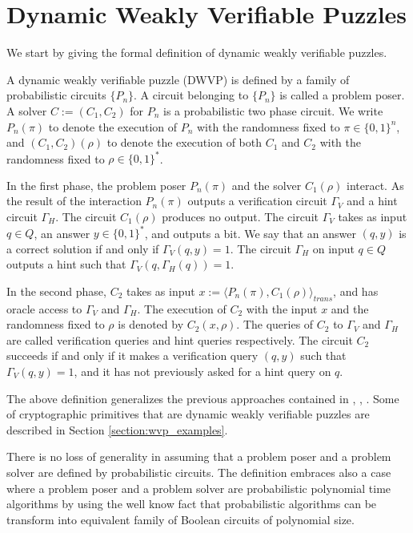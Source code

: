 \documentclass[11pt,a4paper,titlepage]{memoir}
\begin{document}
\section{Dynamic Weakly Verifiable Puzzles}
\label{section:wvp}
We start by giving the formal definition of dynamic weakly verifiable puzzles.
\begin{definition}
  \label{def:dwvp}
  A dynamic weakly verifiable puzzle (DWVP) is defined by a family of probabilistic circuits $\{P_n\}$.
  A circuit belonging to $\{P_n\}$ is called a problem poser.
  A solver $C := (C_1, C_2)$ for $P_n$ is a probabilistic two phase circuit.
  We write $P_n(\pi)$ to denote the execution of $P_n$ with the randomness fixed to $\pi \in \{0,1\}^n$, and $(C_1,C_2)(\rho)$
  to denote the execution of both $C_1$ and $C_2$ with the randomness fixed to $\rho \in \{0,1\}^{*}$.

  In the first phase, the problem poser $P_n(\pi)$ and the solver $C_1(\rho)$ interact.
  As the result of the interaction $P_n(\pi)$ outputs a verification circuit $\Gamma_{V}$ and a hint circuit $\Gamma_{H}$.
  The circuit $C_1(\rho)$ produces no output.
  The circuit $\Gamma_{V}$ takes as input $q \in Q$, an answer $y \in \{0,1\}^*$,
  and outputs a bit. We say that an answer $(q,y)$ is a correct solution if and only if $\Gamma_V(q,y) = 1$.
  The circuit $\Gamma_H$ on input $q \in Q$ outputs a hint such that $\Gamma_V(q,\Gamma_H(q)) = 1$.

  In the second phase, $C_2$ takes as input $x := \langle P_n(\pi), C_1(\rho) \rangle_{\mathit{trans}}$,
  and has oracle access to $\Gamma_V$ and $\Gamma_H$.
  The execution of $C_2$ with the input $x$ and the randomness fixed to $\rho$
  is denoted by $C_2(x, \rho)$. The queries of $C_2$ to $\Gamma_V$ and $\Gamma_H$ are called verification queries and hint queries respectively.
  The circuit $C_2$ succeeds if and only if it makes a verification query $(q,y)$ such that $\Gamma_V(q,y) = 1$,
  and it has not previously asked for a hint query on $q$.
\end{definition}

The above definition generalizes the previous approaches contained in \cite{canetti2004hardness}, \cite{Dodis:2009:SAI:1530441.1530450}, \cite{DBLP:journals/corr/abs-1002-3534}.
Some of cryptographic primitives that are dynamic weakly verifiable puzzles are described in Section \ref{section:wvp_examples}.

There is no loss of generality in assuming that a problem poser and a problem solver are defined by probabilistic circuits.
The definition embraces also a case where a problem poser and a problem solver are probabilistic polynomial time algorithms
by using the well know fact \cite{LectureNotesCT} that probabilistic algorithms can be transform into equivalent family of Boolean circuits of polynomial size.
\end{document}
